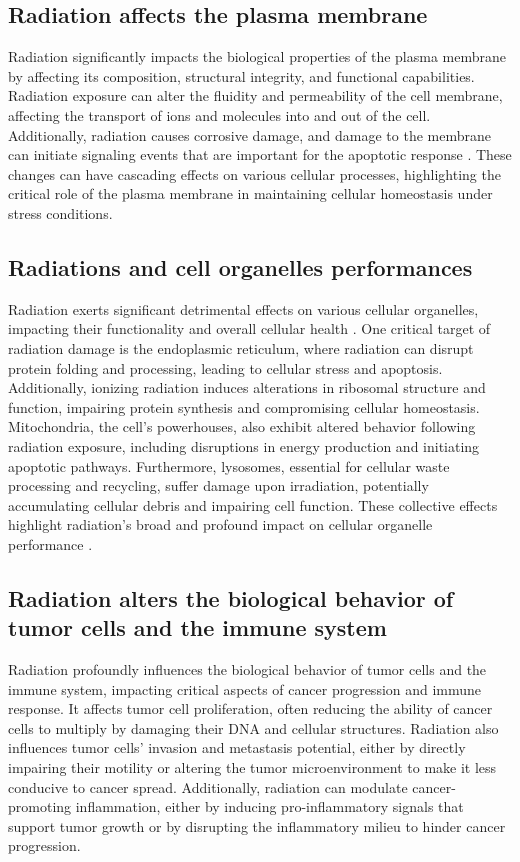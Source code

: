 \subsection{Radiation affects the plasma membrane}
Radiation significantly impacts the biological properties of the plasma membrane by affecting its composition, structural integrity, and functional capabilities.
Radiation exposure can alter the fluidity and permeability of the cell membrane, affecting the transport of ions and molecules into and out of the cell.
Additionally, radiation causes corrosive damage, and damage to the membrane can initiate signaling events that are important for the apoptotic response \cite{CohenJonathan1999}.
These changes can have cascading effects on various cellular processes, highlighting the critical role of the plasma membrane in maintaining cellular homeostasis under stress conditions.

\subsection{Radiations and cell organelles performances}
Radiation exerts significant detrimental effects on various cellular organelles, impacting their functionality and overall cellular health \cite{Somosy2000}.
One critical target of radiation damage is the endoplasmic reticulum, where radiation can disrupt protein folding and processing, leading to cellular stress and apoptosis.
Additionally, ionizing radiation induces alterations in ribosomal structure and function, impairing protein synthesis and compromising cellular homeostasis.
Mitochondria, the cell's powerhouses, also exhibit altered behavior following radiation exposure, including disruptions in energy production and initiating apoptotic pathways.
Furthermore, lysosomes, essential for cellular waste processing and recycling, suffer damage upon irradiation, potentially accumulating cellular debris and impairing cell function.
These collective effects highlight radiation's broad and profound impact on cellular organelle performance \cite{Wang2018}.

\subsection{Radiation alters the biological behavior of tumor cells and the immune system}
Radiation profoundly influences the biological behavior of tumor cells and the immune system, impacting critical aspects of cancer progression and immune response.
It affects tumor cell proliferation, often reducing the ability of cancer cells to multiply by damaging their DNA and cellular structures.
Radiation also influences tumor cells' invasion and metastasis potential, either by directly impairing their motility or altering the tumor microenvironment to make it less conducive to cancer spread.
Additionally, radiation can modulate cancer-promoting inflammation, either by inducing pro-inflammatory signals that support tumor growth or by disrupting the inflammatory milieu to hinder cancer progression.

